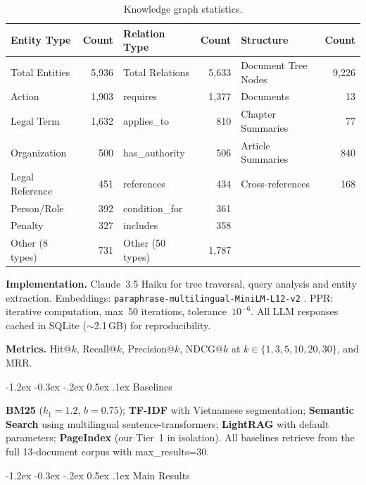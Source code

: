 \documentclass{IOS-Book-Article}
\makeatletter
\renewcommand\subsection{\@startsection{subsection}{2}{\z@}%
  {-1.2ex \@plus -0.3ex \@minus -.2ex}%
  {0.5ex \@plus .1ex}%
  {\normalfont\normalsize\bfseries}}
\makeatother
\begin{document}
\begin{table}[H]
\centering\footnotesize
\caption{Knowledge graph statistics.}
\label{tab:kg-stats}
\begin{tabular}{lr@{\hskip 1.2cm}lr@{\hskip 1.2cm}lr}
\toprule
\textbf{Entity Type} & \textbf{Count} & \textbf{Relation Type} & \textbf{Count} & \textbf{Structure} & \textbf{Count} \\
\midrule
Total Entities & 5,936 & Total Relations & 5,633 & Document Tree Nodes & 9,226 \\
Action & 1,903 & requires & 1,377 & Documents & 13 \\
Legal Term & 1,632 & applies\_to & 810 & Chapter Summaries & 77 \\
Organization & 500 & has\_authority & 506 & Article Summaries & 840 \\
Legal Reference & 451 & references & 434 & Cross-references & 168 \\
Person/Role & 392 & condition\_for & 361 & & \\
Penalty & 327 & includes & 358 & & \\
Other (8 types) & 731 & Other (50 types) & 1,787 & & \\
\bottomrule
\end{tabular}
\end{table}

\textbf{Implementation.} Claude~3.5 Haiku for tree traversal, query analysis and entity extraction. Embeddings: \texttt{paraphrase-multilingual-MiniLM-L12-v2} \cite{r2}. PPR: iterative computation, max~50 iterations, tolerance~$10^{-6}$. All LLM responses cached in SQLite ($\sim$2.1\,GB) for reproducibility.

\textbf{Metrics.} Hit@$k$, Recall@$k$, Precision@$k$, NDCG@$k$ at $k \in \{1,3,5,10,20,30\}$, and MRR.

\subsection{Baselines}

\textbf{BM25} \cite{r18} ($k_1\!=\!1.2$, $b\!=\!0.75$); \textbf{TF-IDF} \cite{r19} with Vietnamese segmentation; \textbf{Semantic Search} \cite{r2} using multilingual sentence-transformers; \textbf{LightRAG} \cite{r5} with default parameters; \textbf{PageIndex} \cite{r7} (our Tier~1 in isolation). All baselines retrieve from the full 13-document corpus with max\_results=30.

\subsection{Main Results}
\end{document}

